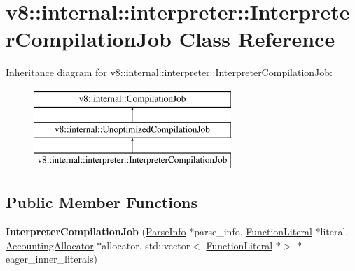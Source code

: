 \hypertarget{classv8_1_1internal_1_1interpreter_1_1InterpreterCompilationJob}{}\section{v8\+:\+:internal\+:\+:interpreter\+:\+:Interpreter\+Compilation\+Job Class Reference}
\label{classv8_1_1internal_1_1interpreter_1_1InterpreterCompilationJob}
Inheritance diagram for v8\+:\+:internal\+:\+:interpreter\+:\+:Interpreter\+Compilation\+Job\+:\begin{figure}[H]
\begin{center}
\leavevmode
\includegraphics[height=3.000000cm]{classv8_1_1internal_1_1interpreter_1_1InterpreterCompilationJob}
\end{center}
\end{figure}
\subsection*{Public Member Functions}
\begin{DoxyCompactItemize}
\item 
\mbox{\label{classv8_1_1internal_1_1interpreter_1_1InterpreterCompilationJob_a7f227f42003c6e890288cf01cf31b03d}} 
{\bfseries Interpreter\+Compilation\+Job} (\mbox{\hyperlink{classv8_1_1internal_1_1ParseInfo}{Parse\+Info}} $\ast$parse\+\_\+info, \mbox{\hyperlink{classv8_1_1internal_1_1FunctionLiteral}{Function\+Literal}} $\ast$literal, \mbox{\hyperlink{classv8_1_1internal_1_1AccountingAllocator}{Accounting\+Allocator}} $\ast$allocator, std\+::vector$<$ \mbox{\hyperlink{classv8_1_1internal_1_1FunctionLiteral}{Function\+Literal}} $\ast$$>$ $\ast$eager\+\_\+inner\+\_\+literals)
\end{DoxyCompactItemize}
